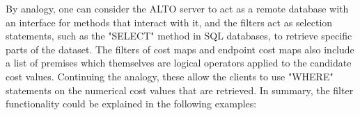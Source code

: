    By analogy, one can consider the ALTO server to act as a remote database with an interface for methods that interact with it, and the filters act as selection statements, such as the "SELECT" method in SQL databases, to retrieve specific parts of the dataset.
    The filters of cost maps and endpoint cost maps also include a list of premises which themselves are logical operators applied to the candidate cost values.
    Continuing the analogy, these allow the clients to use "WHERE" statements on the numerical cost values that are retrieved.
    In summary, the filter functionality could be explained in the following examples:

\begin{table}[]
\end{table}

